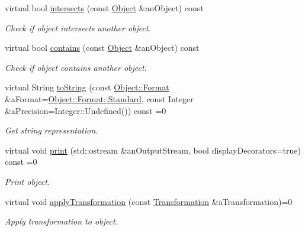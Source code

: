 \begin{DoxyCompactItemize}
virtual bool \hyperlink{classostk_1_1math_1_1geom_1_1d2_1_1_object_a8791f58dd95e68a1eb4271aa15f7cd12}{intersects} (const \hyperlink{classostk_1_1math_1_1geom_1_1d2_1_1_object}{Object} \&an\+Object) const
\begin{DoxyCompactList}\small\item\em Check if object intersects another object. \end{DoxyCompactList}\item 
virtual bool \hyperlink{classostk_1_1math_1_1geom_1_1d2_1_1_object_ad932da22ca5827ee461b822fffd413c1}{contains} (const \hyperlink{classostk_1_1math_1_1geom_1_1d2_1_1_object}{Object} \&an\+Object) const
\begin{DoxyCompactList}\small\item\em Check if object contains another object. \end{DoxyCompactList}\item 
virtual String \hyperlink{classostk_1_1math_1_1geom_1_1d2_1_1_object_ada4c2187dd24ef02b91b6346191f677c}{to\+String} (const \hyperlink{classostk_1_1math_1_1geom_1_1d2_1_1_object_aa76f9e30caebf4005bafbdff447f66cf}{Object\+::\+Format} \&a\+Format=\hyperlink{classostk_1_1math_1_1geom_1_1d2_1_1_object_aa76f9e30caebf4005bafbdff447f66cfaeb6d8ae6f20283755b339c0dc273988b}{Object\+::\+Format\+::\+Standard}, const Integer \&a\+Precision=Integer\+::\+Undefined()) const =0
\begin{DoxyCompactList}\small\item\em Get string representation. \end{DoxyCompactList}\item 
virtual void \hyperlink{classostk_1_1math_1_1geom_1_1d2_1_1_object_ae05ad883ed5a560e38f0aae7a4adc1ea}{print} (std\+::ostream \&an\+Output\+Stream, bool display\+Decorators=true) const =0
\begin{DoxyCompactList}\small\item\em Print object. \end{DoxyCompactList}\item 
virtual void \hyperlink{classostk_1_1math_1_1geom_1_1d2_1_1_object_a959e50211d7a680f7f904bbb752d75c9}{apply\+Transformation} (const \hyperlink{classostk_1_1math_1_1geom_1_1d2_1_1_transformation}{Transformation} \&a\+Transformation)=0
\begin{DoxyCompactList}\small\item\em Apply transformation to object. \end{DoxyCompactList}\end{DoxyCompactItemize}
